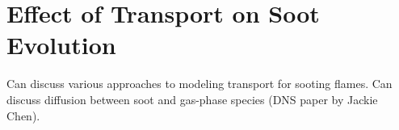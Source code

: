\section{Effect of Transport on Soot Evolution}
\label{sec:intro:transport}

Can discuss various approaches to modeling transport for sooting flames. Can discuss diffusion between soot and gas-phase species (DNS paper by Jackie Chen).
